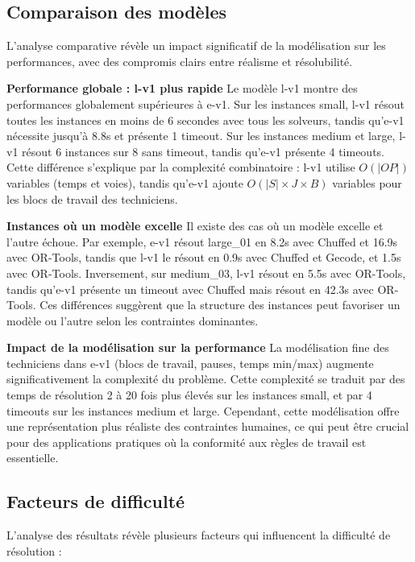 \subsection{Comparaison des modèles}

L'analyse comparative révèle un impact significatif de la modélisation sur les performances, avec des compromis clairs entre réalisme et résolubilité.

\textbf{Performance globale : l-v1 plus rapide} Le modèle l-v1 montre des performances globalement supérieures à e-v1. Sur les instances small, l-v1 résout toutes les instances en moins de 6 secondes avec tous les solveurs, tandis qu'e-v1 nécessite jusqu'à 8.8s et présente 1 timeout. Sur les instances medium et large, l-v1 résout 6 instances sur 8 sans timeout, tandis qu'e-v1 présente 4 timeouts. Cette différence s'explique par la complexité combinatoire : l-v1 utilise $O(|OP|)$ variables (temps et voies), tandis qu'e-v1 ajoute $O(|S| \times J \times B)$ variables pour les blocs de travail des techniciens.

\textbf{Instances où un modèle excelle} Il existe des cas où un modèle excelle et l'autre échoue. Par exemple, e-v1 résout large\_01 en 8.2s avec Chuffed et 16.9s avec OR-Tools, tandis que l-v1 le résout en 0.9s avec Chuffed et Gecode, et 1.5s avec OR-Tools. Inversement, sur medium\_03, l-v1 résout en 5.5s avec OR-Tools, tandis qu'e-v1 présente un timeout avec Chuffed mais résout en 42.3s avec OR-Tools. Ces différences suggèrent que la structure des instances peut favoriser un modèle ou l'autre selon les contraintes dominantes.

\textbf{Impact de la modélisation sur la performance} La modélisation fine des techniciens dans e-v1 (blocs de travail, pauses, temps min/max) augmente significativement la complexité du problème. Cette complexité se traduit par des temps de résolution 2 à 20 fois plus élevés sur les instances small, et par 4 timeouts sur les instances medium et large. Cependant, cette modélisation offre une représentation plus réaliste des contraintes humaines, ce qui peut être crucial pour des applications pratiques où la conformité aux règles de travail est essentielle.

\subsection{Facteurs de difficulté}

L'analyse des résultats révèle plusieurs facteurs qui influencent la difficulté de résolution :

